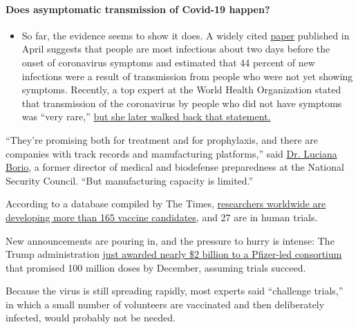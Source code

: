\begin{itemize}
{  \paragraph{Does asymptomatic transmission of Covid-19
  happen?}\label{does-asymptomatic-transmission-of-covid-19-happen}}

  \begin{itemize}
  \tightlist
  \item
    So far, the evidence seems to show it does. A widely cited
    \href{https://www.nature.com/articles/s41591-020-0869-5}{paper}
    published in April suggests that people are most infectious about
    two days before the onset of coronavirus symptoms and estimated that
    44 percent of new infections were a result of transmission from
    people who were not yet showing symptoms. Recently, a top expert at
    the World Health Organization stated that transmission of the
    coronavirus by people who did not have symptoms was ``very rare,''
    \href{https://www.nytimes3xbfgragh.onion/2020/06/09/world/coronavirus-updates.html?action=click\&pgtype=Article\&state=default\&region=MAIN_CONTENT_3\&context=storylines_faq\#link-1f302e21}{but
    she later walked back that statement.}
  \end{itemize}
\end{itemize}

``They're promising both for treatment and for prophylaxis, and there
are companies with track records and manufacturing platforms,'' said
\href{http://leighbureau.com/speakers/lborio}{Dr. Luciana Borio}, a
former director of medical and biodefense preparedness at the National
Security Council. ``But manufacturing capacity is limited.''

According to a database compiled by The Times,
\href{https://www.nytimes3xbfgragh.onion/interactive/2020/science/coronavirus-vaccine-tracker.html}{researchers
worldwide are developing more than 165 vaccine candidates}, and 27 are
in human trials.

New announcements are pouring in, and the pressure to hurry is intense:
The Trump administration
\href{https://www.nytimes3xbfgragh.onion/2020/07/22/us/politics/pfizer-coronavirus-vaccine.html}{just
awarded nearly \$2 billion to a Pfizer-led consortium} that promised 100
million doses by December, assuming trials succeed.

Because the virus is still spreading rapidly, most experts said
``challenge trials,'' in which a small number of volunteers are
vaccinated and then deliberately infected, would probably not be needed.

